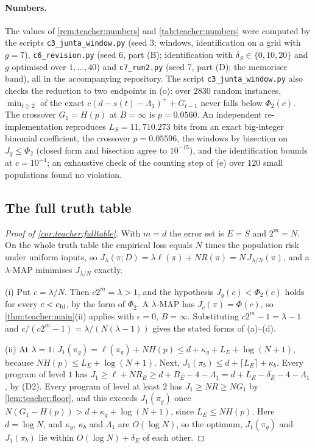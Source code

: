 \paragraph{Numbers.} The values of \cref{rem:teacher:numbers} and \cref{tab:teacher:numbers} were computed by the scripts \texttt{c3\_\allowbreak{}junta\_\allowbreak{}window.py} (seed 3; windows, identification on a grid with $g=7$), \texttt{c6\_\allowbreak{}revision.py} (seed 6, part (B); identification with $\delta_S\in\{0,10,20\}$ and $g$ optimised over $1,\dots,40$) and \texttt{c7\_\allowbreak{}run2.py} (seed 7, part (D); the memoriser band), all in the accompanying repository. The script \texttt{c3\_\allowbreak{}junta\_\allowbreak{}window.py} also checks the reduction to two endpoints in (o): over $2830$ random instances, $\min_{t\ge2}$ of the exact $c(d-s(t)-\Lambda_1)^++G_{t-1}$ never falls below $\Phi_2(c)$. The crossover $G_1=H(p)$ at $B=\infty$ is $p=0.0560$. An independent re-implementation reproduces $L_S=11{,}710.273$ bits from an exact big-integer binomial coefficient, the crossover $p=0.05596$, the windows by bisection on $J_g\le\Phi_2$ (closed form and bisection agree to $10^{-15}$), and the identification bounds at $c=10^{-4}$; an exhaustive check of the counting step of (e) over $120$ small populations found no violation.

\subsection{The full truth table}\label{app:teacher:fulltable}

\begin{proof}[Proof of \cref{cor:teacher:fulltable}]
With $m=d$ the error set is $E=S$ and $2^m=N$. On the whole truth table the empirical loss equals $N$ times the population risk under uniform inputs, so $J_\lambda(\pi;D)=\lambda\ell(\pi)+NR(\pi)=N\,J_{\lambda/N}(\pi)$, and a $\lambda$-MAP minimises $J_{\lambda/N}$ exactly.

(i) Put $c=\lambda/N$. Then $c2^m=\lambda>1$, and the hypothesis $J_g(c)<\Phi_2(c)$ holds for every $c<c_{\rm hi}$, by the form of $\Phi_2$. A $\lambda$-MAP has $J_c(\pi)=\Phi(c)$, so \cref{thm:teacher:main}(ii) applies with $\epsilon=0$, $B=\infty$. Substituting $c2^m-1=\lambda-1$ and $c/(c2^m-1)=\lambda/(N(\lambda-1))$ gives the stated forms of (a)--(d).

(ii) At $\lambda=1$: $J_1(\pi_g)=\ell(\pi_g)+NH(p)\le d+\kappa_g+L_E+\log(N+1)$, because $NH(p)\le L_E+\log(N+1)$. Next, $J_1(\pi_b)\le d+\lceil L_E\rceil+\kappa_b$. Every program of level $1$ has $J_1\ge\ell+NR_B\ge d+B_E-4-\Lambda_1=d+L_E-\delta_E-4-\Lambda_1$, by (D2). Every program of level at least $2$ has $J_1\ge NR\ge NG_1$ by \cref{lem:teacher:floor}, and this exceeds $J_1(\pi_g)$ once $N(G_1-H(p))>d+\kappa_g+\log(N+1)$, since $L_E\le NH(p)$. Here $d=\log N$, and $\kappa_g$, $\kappa_b$ and $\Lambda_1$ are $O(\log N)$, so the optimum, $J_1(\pi_g)$ and $J_1(\pi_b)$ lie within $O(\log N)+\delta_E$ of each other.
\end{proof}

